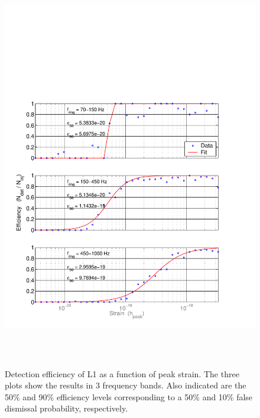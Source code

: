 \begin{figure}[!h]
\centerline{\includegraphics[angle=0,height=7in]{Figures/Chap7/eff-L1.pdf}}
\caption[L1 Detection Efficiency]{Detection efficiency of L1 as a function of peak strain. 
         The three plots show the results in 3 frequency bands. Also indicated are the 
         50\% and 90\% efficiency levels corresponding to a 50\% and 10\% false dismissal 
         probability, respectively.}
\label{fig:L1efficiency}
\end{figure}

